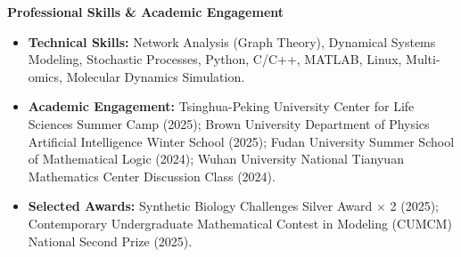 \documentclass[10pt]{article}
\begin{document}
	\vspace{2pt}
	\begin{center}
		\textbf{\large Professional Skills \& Academic Engagement}
	\end{center}
	\vspace{-4pt}
	\begin{itemize}[noitemsep, topsep=2pt, partopsep=0pt, parsep=0pt, leftmargin=*]
		\item \textbf{Technical Skills:} Network Analysis (Graph Theory), Dynamical Systems Modeling, Stochastic Processes, Python, C/C++, MATLAB, Linux, Multi-omics, Molecular Dynamics Simulation.
		\item \textbf{Academic Engagement:} Tsinghua-Peking University Center for Life Sciences Summer Camp (2025); Brown University Department of Physics Artificial Intelligence Winter School (2025); Fudan University Summer School of Mathematical Logic (2024); Wuhan University National Tianyuan Mathematics Center Discussion Class (2024).
		\item \textbf{Selected Awards:} Synthetic Biology Challenges Silver Award $\times$ 2 (2025); Contemporary Undergraduate Mathematical Contest in Modeling (CUMCM) National Second Prize (2025).
	\end{itemize}
	
\end{document}
